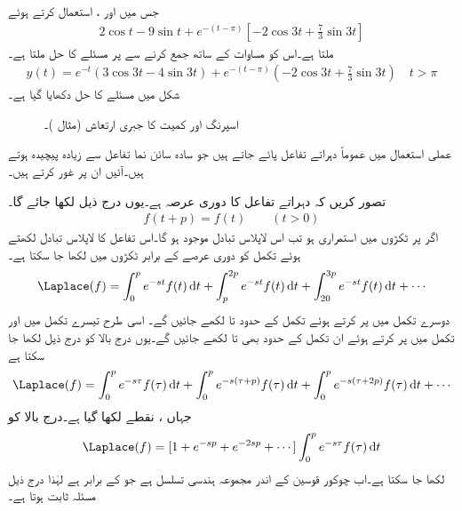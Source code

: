 جس میں  اور   ،  استعمال کرتے ہوئے
\begin{align*}
2\cos t-9\sin t+e^{-(t-\pi)}[-2\cos 3t+\frac{7}{3}\sin 3t]
\end{align*}
ملتا ہے۔اس کو مساوات   کے ساتھ جمع کرنے سے  پر مسئلے کا حل ملتا ہے۔
\begin{multline}
y(t)=e^{-t}(3\cos 3t-4\sin 3t)+e^{-(t-\pi)}(-2\cos 3t+\frac{7}{3}\sin 3t) \quad t>\pi
\end{multline} 
شکل  میں مسئلے کا حل دکھایا گیا ہے۔
\begin{figure}
\centering
{}
\caption{اسپرنگ اور کمیت کا جبری ارتعاش (مثال )۔}
\label{شکل_مثال_لاپلاس_بدل_نیم_موج}
\end{figure}

عملی استعمال میں عموماً دہراتے تفاعل پائے جاتے ہیں جو سادہ سائن نما تفاعل سے زیادہ پیچیدہ ہوتے ہیں۔آئیں ان پر غور کرتے ہیں۔

تصور کریں کہ دہراتے تفاعل  کا دوری عرصہ  ہے۔یوں درج ذیل لکھا جائے گا۔
\begin{align}
f(t+p)=f(t)\quad \quad (t>0)
\end{align}
اگر  پر  ٹکڑوں میں استمراری ہو تب اس لاپلاس تبادل موجود ہو گا۔اس تفاعل کا لاپلاس تبادل  لکھتے ہوئے تکمل کو دوری عرصے کے برابر ٹکڑوں میں لکھا جا سکتا ہے۔
\begin{align*}
\Laplace(f)=\int_{0}^{p}e^{-st}f(t)\dif t+\int_{p}^{2p}e^{-st}f(t)\dif t+\int_{20}^{3p}e^{-st}f(t)\dif t+\cdots
\end{align*}     
دوسرے تکمل میں  پر کرتے ہوئے تکمل کے حدود  تا  لکھے جائیں گے۔ اسی طرح تیسرے تکمل میں  اور   تکمل میں  پر کرتے ہوئے ان تکمل کے حدود بھی  تا  لکھے جائیں گے۔یوں درج بالا کو درج ذیل لکھا جا سکتا ہے
\begin{align*}
\Laplace(f)=\int_{0}^{p}e^{-s\tau}f(\tau)\dif t+\int_{0}^{p}e^{-s(\tau+p)}f(\tau)\dif t+\int_{0}^{p}e^{-s(\tau+2p)}f(\tau)\dif t+\cdots
\end{align*}   
جہاں ،  نقطے لکھا گیا ہے۔درج بالا کو
\begin{align*}
\Laplace(f)=[1+e^{-sp}+e^{-2sp}+\cdots]\int_{0}^{p}e^{-s\tau}f(\tau)\dif t
\end{align*}   
لکھا جا سکتا ہے۔اب چوکور قوسین کے اندر مجموعہ ہندسی تسلسل ہے جو  کے برابر ہے  لہٰذا درج ذیل مسئلہ ثابت ہوتا ہے۔


